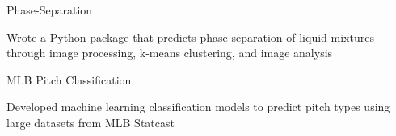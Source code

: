 
\begin{cventries}
  \cventry
    {} %
    {Phase-Separation} %
    {} %
    {} %
    {
      \begin{cvitems} %
        \item {Wrote a Python package that predicts phase separation of liquid
            mixtures through image processing, k-means clustering, and image
              analysis}
      \end{cvitems}
    }

  \cventry
    {} %
    {MLB Pitch Classification} %
    {} %
    {} %
    {
      \begin{cvitems} %
      	\item {Developed machine learning classification models to predict pitch types using
            large datasets from MLB
            Statcast}
      \end{cvitems}
    }

\end{cventries}
